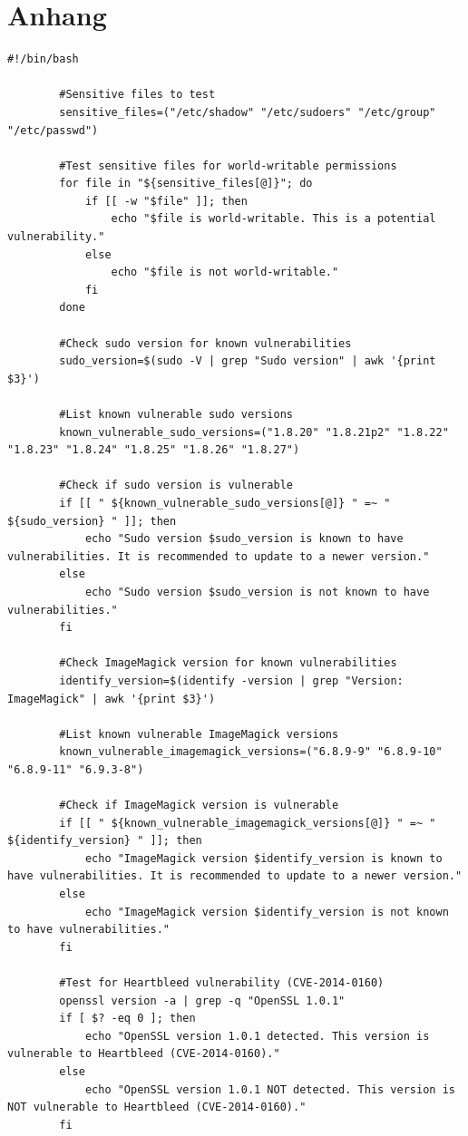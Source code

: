 \documentclass[10pt, a4paper,onecolumn ,titlepage]{article}
\begin{document}
    \section{Anhang}
    \label{sec:Anhang}

    \begin{lstlisting}[label={lst:schwachstellentestSkript}]
        #!/bin/bash

        #Sensitive files to test
        sensitive_files=("/etc/shadow" "/etc/sudoers" "/etc/group" "/etc/passwd")

        #Test sensitive files for world-writable permissions
        for file in "${sensitive_files[@]}"; do
            if [[ -w "$file" ]]; then
                echo "$file is world-writable. This is a potential vulnerability."
            else
                echo "$file is not world-writable."
            fi
        done

        #Check sudo version for known vulnerabilities
        sudo_version=$(sudo -V | grep "Sudo version" | awk '{print $3}')

        #List known vulnerable sudo versions
        known_vulnerable_sudo_versions=("1.8.20" "1.8.21p2" "1.8.22" "1.8.23" "1.8.24" "1.8.25" "1.8.26" "1.8.27")

        #Check if sudo version is vulnerable
        if [[ " ${known_vulnerable_sudo_versions[@]} " =~ " ${sudo_version} " ]]; then
            echo "Sudo version $sudo_version is known to have vulnerabilities. It is recommended to update to a newer version."
        else
            echo "Sudo version $sudo_version is not known to have vulnerabilities."
        fi

        #Check ImageMagick version for known vulnerabilities
        identify_version=$(identify -version | grep "Version: ImageMagick" | awk '{print $3}')

        #List known vulnerable ImageMagick versions
        known_vulnerable_imagemagick_versions=("6.8.9-9" "6.8.9-10" "6.8.9-11" "6.9.3-8")

        #Check if ImageMagick version is vulnerable
        if [[ " ${known_vulnerable_imagemagick_versions[@]} " =~ " ${identify_version} " ]]; then
            echo "ImageMagick version $identify_version is known to have vulnerabilities. It is recommended to update to a newer version."
        else
            echo "ImageMagick version $identify_version is not known to have vulnerabilities."
        fi

        #Test for Heartbleed vulnerability (CVE-2014-0160)
        openssl version -a | grep -q "OpenSSL 1.0.1"
        if [ $? -eq 0 ]; then
            echo "OpenSSL version 1.0.1 detected. This version is vulnerable to Heartbleed (CVE-2014-0160)."
        else
            echo "OpenSSL version 1.0.1 NOT detected. This version is NOT vulnerable to Heartbleed (CVE-2014-0160)."
        fi


\end{lstlisting}
\end{document}
